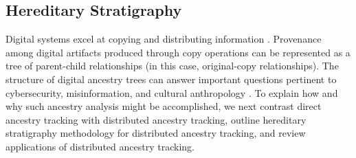 


\subsection{Hereditary Stratigraphy} \label{sec:hereditary-stratigraphy}

Digital systems excel at copying and distributing information \citep{miller2001taking}.
Provenance among digital artifacts produced through copy operations can be represented as a tree of parent-child relationships (in this case, original-copy relationships).
The structure of digital ancestry trees can answer important questions pertinent to cybersecurity, misinformation, and cultural anthropology \citep{aslan2020comprehensive,dupuis2019spread,ling2021dissecting}.
To explain how and why such ancestry analysis might be accomplished, we next contrast direct ancestry tracking with distributed ancestry tracking, outline hereditary stratigraphy methodology for distributed ancestry tracking, and review applications of distributed ancestry tracking.

